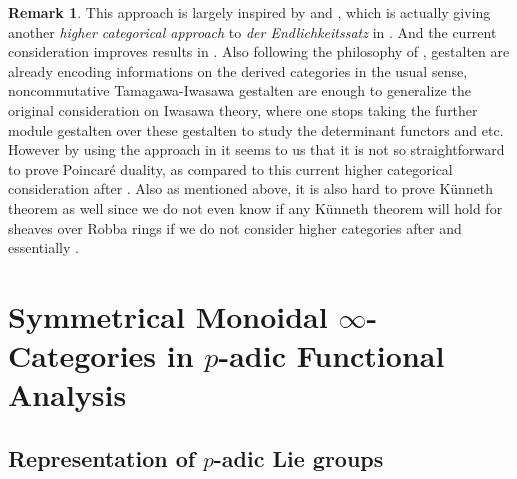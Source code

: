 \documentclass[12pt]{article}
\theoremstyle{definition}
\newtheorem{remark}{Remark}
\begin{document}
\begin{remark}
This approach is largely inspired by \cite{5S5} and \cite{5M}, which is actually giving another \textit{higher categorical approach} to \textit{der Endlichkeitssatz} in \cite{T}. And the current consideration improves results in \cite{T}. Also following the philosophy of \cite{5S5}, gestalten are already encoding informations on the derived categories in the usual sense, noncommutative Tamagawa-Iwasawa gestalten are enough to generalize the original consideration on Iwasawa theory, where one stops taking the further module gestalten over these gestalten to study the determinant functors and etc. However by using the approach in \cite{T} it seems to us that it is not so straightforward to prove Poincar\'e duality, as compared to this current higher categorical consideration after \cite{5S5}. Also as mentioned above, it is also hard to prove K\"unneth theorem as well since we do not even know if any K\"unneth theorem will hold for sheaves over Robba rings if we do not consider higher categories after \cite{5S5} and essentially \cite{5Ga}.
\end{remark}




\newpage
\section{Symmetrical Monoidal $\infty$-Categories in $p$-adic Functional Analysis}

\subsection{Representation of $p$-adic Lie groups}
\end{document}
